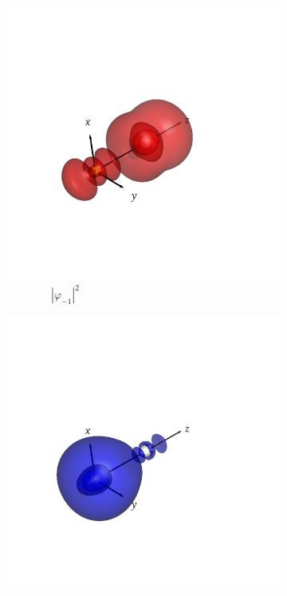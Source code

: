 \documentclass[journal=inoraj,manuscript=article]{achemso}
\begin{document}
\begin{figure}[!h]
    \vspace{0.0cm}
    \begin{subfigure}[t]{0.32\textwidth}
        \centering
        \includegraphics[width=\linewidth]{./AuOg+/nocv-1.png} 
        \caption*{\ \ \ \ \ \ \ \ $|\varphi_{-1}|^2$} 
    \end{subfigure}
    \hfill
    \begin{subfigure}[t]{0.32\textwidth}
        \centering
        \includegraphics[width=\linewidth]{./AuOg+/nocv+1.png} 

\end{subfigure}
\end{figure}
\end{document}
